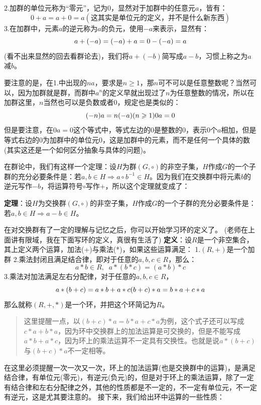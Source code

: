\documentclass[12pt, a4paper, oneside]{ctexart}
\newenvironment{myquote}{\begin{quote}\small\color{gray}}{\end{quote}}
\begin{document}
2.加群的单位元称为“零元”，记为0，显然对于加群中的任意元$a$，皆有：
\[
0+a=a+0=a(这其实是单位元的定义，并不是什么新东西)
\]
3.在加群中，元素$a$的逆元称为$a$的负元，使用$-a$来表示，显然有：
\[
a+(-a)=(-a)+a=0\\
-(-a)=a
\]
(看不出来显然的回去看群论去)，我们将$a+(-b)$简写成$a-b$，习惯上称之为$a$减$b$。

要注意的是，在1.中出现的$na$，要求是$n\geqslant1$，那$n$可不可以是任意整数呢？当然可以，因为加群就是群，而群中$a^n$的定义早就出现过了$n$为任意整数的情况，所以在加群这里，$n$当然也可以是负数或者0，规定也是类似的：
\[
(-n)a=n(-a)(n\geqslant1)\\
0a=0
\]
但是要注意，在$0a=0$这个等式中，等式左边的0是整数的0，表示0个$a$相加，但是等式右边的0为加群中的单位元0，这是加群中的元素，而不是任何一个具体的数(其实这还是一个如何区分抽象与具体的问题)。

在群论中，我们有这样一个定理：设$H$为群$(G,\circ)$的非空子集，$H$作成$G$的一个子群的充分必要条件是：若$a,b\in H\Rightarrow a\circ b^{-1}\in H$。因为我们在交换群中将元素$b$的逆元写作$-b$，将运算符号$\circ$写作$+$，所以这个定理就变成了：

\textbf{定理}：设$H$为交换群$(G,\circ)$的非空子集，$H$作成$G$的一个子群的充分必要条件是：若$a,b\in H\Rightarrow a- b\in H$。

在对交换群有了一定的理解与记忆之后，你可以开始学习环的定义了。
(老师在上面讲有限域，我在下面写环的定义，真很有生活了)
\textbf{定义}：设$R$是一个非空集合，其上定义两个运算，加法(+)与乘法(*)，如果这些运算满足：
1.$(R,+)$是一个加群
2.乘法封闭且满足结合律，即对于任意的$a,b,c\in R$，那么：
\[
a*b\in R,\;\; a*(b*c)=(a*b)*c
\]
3.乘法对加法满足左右分配律，对于任意的$a,b,c\in R$，
\[
a*(b+c)=a*b+a*c\\
(b+c)*a=b*a+c*a\\
\]
那么就称$(R,+,*)$是一个环，并把这个环简记为$R$。

\begin{myquote}
这里提醒一点，以$(b+c)*a=b*a+c*a$为例，这个式子还可以写成$c*a+b*a$，因为环中交换群上的加法运算是可交换的，但是不能写成$a*b+a*c$，因为环上的乘法运算不一定具有交换性。也就是说$a*(b+c)$与$(b+c)*a$不一定相等。
\end{myquote}

在这里必须提醒一次一次又一次，环上的加法运算(也是交换群中的运算)，是满足结合律，有单位元(零元)，有逆元(负元)的，但是对于环上的乘法运算，除了一定有结合律和左右分配律之外，其他的性质都是不一定的，不一定有单位元，不一定有逆元，这是尤其要注意的。
接下来，我们给出环中运算的一些性质：
\end{document}
